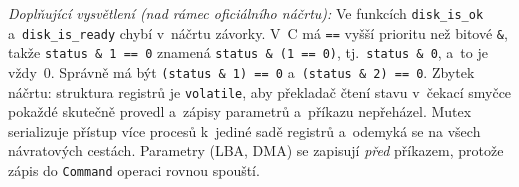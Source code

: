 \medskip
\noindent\textit{Doplňující vysvětlení (nad rámec oficiálního náčrtu):} Ve funkcích
\texttt{disk\_is\_ok} a~\texttt{disk\_is\_ready} chybí v~náčrtu závorky. V~C má \texttt{==} vyšší
prioritu než bitové \texttt{\&}, takže \texttt{status \& 1 == 0} znamená \texttt{status \& (1 == 0)},
tj.\ \texttt{status \& 0}, a~to je vždy~0. Správně má být \texttt{(status \& 1) == 0}
a~\texttt{(status \& 2) == 0}. Zbytek náčrtu: struktura registrů je \texttt{volatile}, aby překladač
čtení stavu v~čekací smyčce pokaždé skutečně provedl a~zápisy parametrů a~příkazu nepřeházel.
Mutex serializuje přístup více procesů k~jediné sadě registrů a~odemyká se na všech návratových
cestách. Parametry (LBA, DMA) se zapisují \emph{před} příkazem, protože zápis do \texttt{Command}
operaci rovnou spouští.
